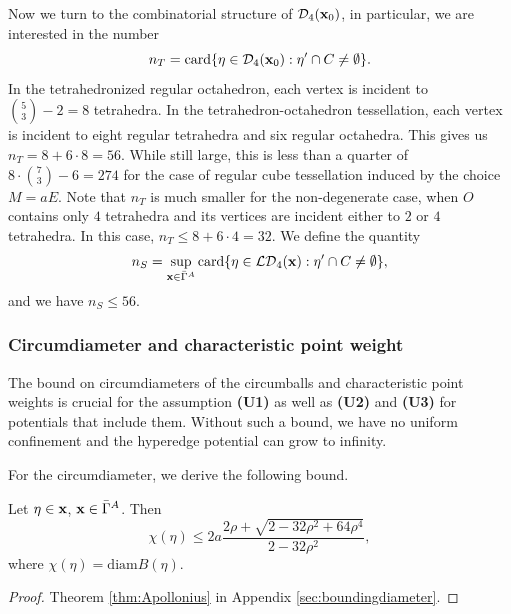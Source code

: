 Now we turn to the combinatorial structure of $\mathcal D_4({\mathbf{x}}_0)$, in particular, we are interested in the number
$$n_T = \mathrm{card}\{\eta \in \mathcal D_4({\mathbf{x}}_0): \eta' \cap C \neq \emptyset \}.$$
In the tetrahedronized regular octahedron, each vertex is incident to $\binom{5}{3}-2=8$ tetrahedra. In the tetrahedron-octahedron tessellation, each  vertex is incident to eight regular tetrahedra and six regular octahedra. This gives us $n_T = 8 + 6\cdot 8 = 56$. While still large, this is less than a quarter of $8\cdot \binom{7}{3}-6 = 274$ for the case of regular cube tessellation induced by the choice $M=aE$. Note that $n_T$ is much smaller for the non-degenerate case, when $O$ contains only $4$ tetrahedra and its vertices are incident either to $2$ or $4$ tetrahedra. In this case, $n_T\leq 8+6\cdot 4 = 32$. We define the quantity
$$n_S = \sup_{{\mathbf{x}} \in \bar\Gamma^A} \mathrm{card}\{\eta \in \mathcal {LD}_4({\mathbf{x}}): \eta' \cap C \neq \emptyset \},$$
and we have $n_S \leq 56$.

\subsubsection{Circumdiameter and characteristic point weight}
The bound on circumdiameters of the circumballs and characteristic point weights is crucial for the assumption \textbf{(U1)} as well as \textbf{(U2)} and \textbf{(U3)} for potentials that include them. Without such a bound, we have no uniform confinement and the hyperedge potential can grow to infinity.\newline 

\noindent For the circumdiameter, we derive the following bound.
\begin{proposition}\label{prop:maxcircum}
	Let $\eta \in {\mathbf{x}}$, ${\mathbf{x}} \in \bar\Gamma^A$. Then 
	$$\chi(\eta) \leq  2a \frac{2\rho + \sqrt{2 - 32\rho^2 + 64 \rho^4}}{2-32\rho^2},$$
	where $\chi(\eta) = \mathrm{diam}B(\eta)$.
\end{proposition}
\begin{proof}
	Theorem \ref{thm:Apollonius} in Appendix \ref{sec:boundingdiameter}.
\end{proof}

